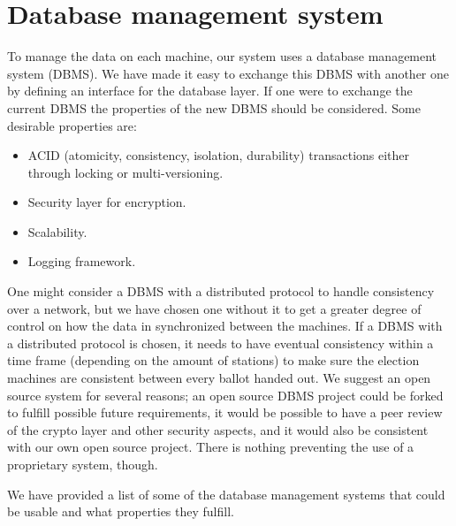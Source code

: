 \documentclass[a4paper]{report}
\begin{document}
\section{Database management system}
\label{sec:dbms}
To manage the data on each machine, our system uses a database management system (DBMS). We have made it easy to exchange this DBMS with another one by defining an interface for the database layer. If one were to exchange the current DBMS the properties of the new DBMS should be considered. Some desirable properties are:

\begin{itemize}
\item ACID (atomicity, consistency, isolation, durability)  transactions either through locking or multi-versioning.
\item Security layer for encryption.
\item Scalability.
\item Logging framework.
\end{itemize}

\noindent One might consider a DBMS with a distributed protocol to handle consistency over a network, but we have chosen one without it to get a greater degree of control on how the data in synchronized between the machines. If a DBMS with a distributed protocol is chosen, it needs to have eventual consistency within a time frame (depending on the amount of stations) to make sure the election machines are consistent between every ballot handed out. We suggest an open source system for several reasons; an open source DBMS project could be forked to fulfill possible future requirements, it would be possible to have a peer review of the crypto layer and other security aspects, and it would also be consistent with our own open source project. There is nothing preventing the use of a proprietary system, though. 

We have provided a list of some of the database management systems that could be usable and what properties they fulfill. 
\end{document}
